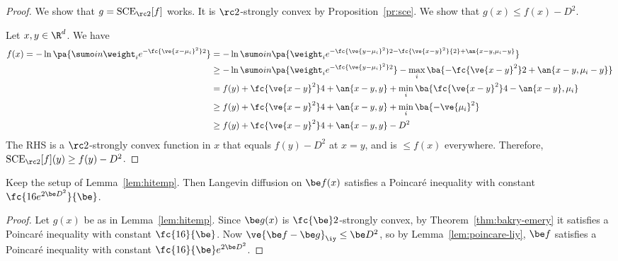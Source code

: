\begin{proof}
We show that $g = \text{SCE}_{\rc2}[f]$ works. It is $\rc2$-strongly convex by Proposition~\ref{pr:sce}. We show that $g(x) \le f(x) -D^2$. 

Let $x,y\in \R^d$. %
We have
\begin{align}
f(x) = -\ln\pa{ \sumo in \weight_i e^{-\fc{\ve{x-\mu_i}^2}2}}
&= -\ln \sumo in \pa{\weight_i e^{-\fc{\ve{y-\mu_i}^2}2 - \fc{\ve{x-y}^2}{2} + \an{x-y, \mu_i-y}}}\\
&\ge -\ln \sumo in \pa{\weight_i e^{-\fc{\ve{y-\mu_i}^2}2}} - \max_i\ba{-\fc{\ve{x-y}^2}2 + \an{x-y, \mu_i-y}}\\
& = f(y) + \fc{\ve{x-y}^2}4 + \an{x-y,y} + \min_i \ba{\fc{\ve{x-y}^2}4 - \an{x-y},\mu_i}\\
&\ge f(y) + \fc{\ve{x-y}^2}4 + \an{x-y,y}  +\min_i\ba{-\ve{\mu_i}^2}\\
&\ge f(y) + \fc{\ve{x-y}^2}4 + \an{x-y,y}  - D^2
\end{align}
The RHS is a $\rc2$-strongly convex function in $x$ that equals $f(y)-D^2 $ at $x=y$, and is $\le f(x)$ everywhere. Therefore, $\text{SCE}_{\rc 2}[f](y) \ge f(y) -D^2$.
\end{proof}
\begin{lem}\label{lem:hitempmix}
Keep the setup of Lemma~\ref{lem:hitemp}. Then Langevin diffusion on $\be f(x)$ satisfies a Poincar\'e inequality with constant $\fc{ 16e^{2\be D^2}}{\be}$.
\end{lem}
\begin{proof}
Let $g(x)$ be as in Lemma~\ref{lem:hitemp}. Since $\be g(x)$ is $\fc{\be}2$-strongly convex, by Theorem~\ref{thm:bakry-emery} it satisfies a Poincar\'e inequality with constant $\fc{16}{\be}$. Now $\ve{\be f-\be g}_{\iy}\le \be D^2$, so by Lemma~\ref{lem:poincare-liy}, $\be f$ satisfies a Poincar\'e inequality with constant $\fc{16}{\be}e^{2\be D^2}$.
\end{proof}

